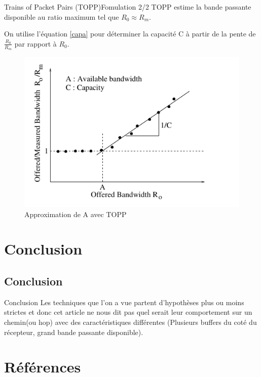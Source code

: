 \documentclass[compress]{beamer}
\begin{document}
\begin{frame}{Trains of Packet Pairs (TOPP)}{Fomulation 2/2}
TOPP estime la bande passante disponible au ratio maximum tel que 
$R_0 \approx R_m$.

On utilise l'équation \eqref{capa} pour déterminer la capacité C à partir 
de la pente de $\frac{R_0}{R_m}$ par rapport à $R_0$.
\begin{figure}[hbtp]
		\centering
		\includegraphics[scale=0.4]{TOPP.png}
		\caption{Approximation de A avec TOPP}
	\end{figure}
\end{frame}

\section{Conclusion}
\subsection{Conclusion}
\begin{frame}{Conclusion}
Les techniques que l'on a vue partent d'hypothèses plus ou moins strictes et donc cet article ne nous dit pas quel serait leur comportement sur un chemin(ou hop) avec des caractéristiques
différentes (Plusieurs buffers du coté du récepteur, grand bande
passante disponible).  
\end{frame}
\section{Références}
\end{document}
